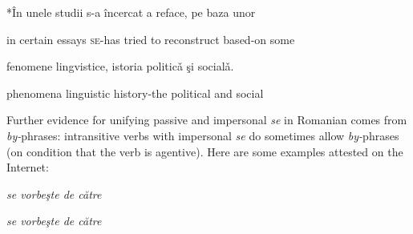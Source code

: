 \documentclass[output=paper]{langsci/langscibook}
\begin{document}
*În unele     studii   s-a       încercat a  reface,        pe baza   unor 

        in certain essays    \textsc{se}{}-has tried     to reconstruct based-on some

      fenomene   lingvistice, istoria        politicǎ   şi    socialǎ.  

      phenomena linguistic   history-the political and social

Further evidence for unifying passive and impersonal \textit{se} in Romanian comes from \textit{by-}phrases: intransitive verbs with impersonal \textit{se} do sometimes allow \textit{by-}phrases (on condition that the verb is agentive). Here are some examples attested on the Internet:

 \emph{se vorbeşte de către}\textstylest{} 

\begin{styleDSb}
\textstylest{}   
\end{styleDSb}

\begin{styleDSb}
\end{styleDSb}

\begin{styleDSb}
\end{styleDSb}

\begin{styleDSb}
\textstylest{}  
\end{styleDSb}

\begin{styleDSb}
\end{styleDSb}

\begin{styleDSb}
\end{styleDSb}

\begin{styleDSb}
 \emph{se vorbeşte de  către}\textstylest{ }
\end{styleDSb}
\end{document}

